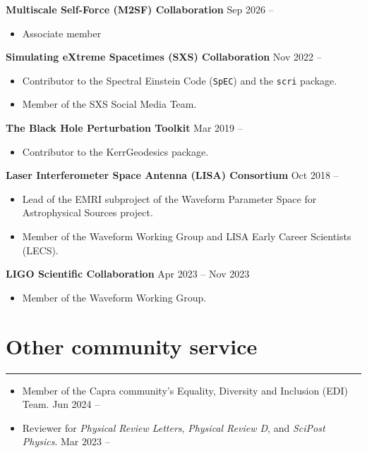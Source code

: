 \documentclass[10.5pt, oneside]{article}   	%
\begin{document}
{\bf Multiscale Self-Force (M2SF) Collaboration}  \hfill Sep 2026 -- \\
\vspace{-5mm}
\begin{itemize}
\item Associate member
\end{itemize} 
{\bf Simulating eXtreme Spacetimes (SXS) Collaboration}  \hfill Nov 2022 -- \\
\vspace{-5mm}
\begin{itemize}
\item Contributor to the Spectral Einstein Code (\texttt{SpEC}) and the \texttt{scri} package.
\item Member of the SXS Social Media Team.
\end{itemize} 
{\bf The Black Hole Perturbation Toolkit}  \hfill Mar 2019 -- \\
\vspace{-5mm}
\begin{itemize}
\item Contributor to the KerrGeodesics package.
\end{itemize}
{\bf Laser Interferometer Space Antenna (LISA) Consortium}  \hfill Oct 2018 -- \\
\vspace{-5mm}
\begin{itemize}
\item Lead of the EMRI subproject of the Waveform Parameter Space for Astrophysical Sources project.
\item Member of the Waveform Working Group and LISA Early Career Scientists (LECS).
\end{itemize} 
{\bf LIGO Scientific Collaboration}  \hfill Apr 2023 -- Nov 2023 \\
\vspace{-5mm}
\begin{itemize}
\item Member of the Waveform Working Group.
\end{itemize} 

 {\color{Sectioncolour}
\section*{Other community service}
\vspace{-3mm}
\noindent\rule{\linewidth}{0.6pt}}
\begin{itemize}
\item Member of the Capra community's Equality, Diversity and Inclusion (EDI) Team.  \hfill Jun 2024 --\\ \vspace{-5mm}
\item Reviewer for {\em Physical Review Letters},  {\em Physical Review D}, and {\em SciPost Physics}.  \hfill Mar 2023 --\\ \vspace{-5mm}
\end{itemize} 
\end{document}
